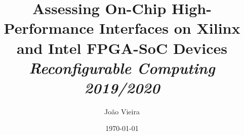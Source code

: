 \documentclass[10pt,a4paper]{article} %
\title{ %
    \textbf{Assessing On-Chip High-Performance Interfaces on Xilinx and Intel \acs{FPGA}-\acs{SoC} Devices}\\ %
    \textit{Reconfigurable Computing 2019/2020} %
} %
\author{João Vieira} %
\date{\today} %
\begin{document}
%
\maketitle %
%
\begin{abstract} %
\end{abstract} %
% 
\acresetall %
%
%
%
\appendix %
%
\end{document}
